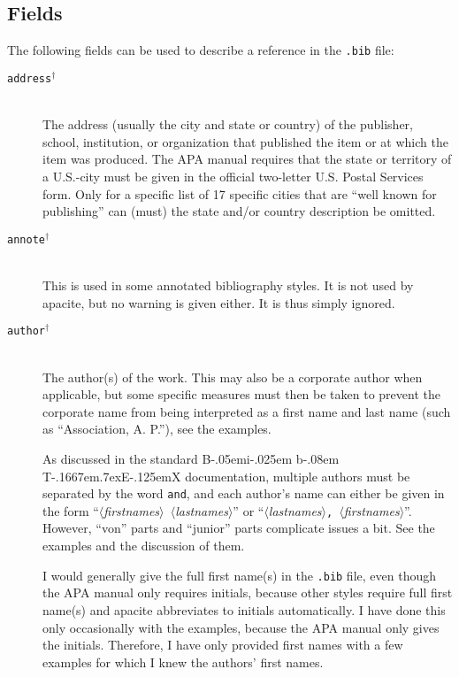 \documentclass{article}
\def\BibTeX{{\rm B\kern-.05em{\sc i\kern-.025em b}\kern-.08em
    T\kern-.1667em\lower.7ex\hbox{E}\kern-.125emX}}%
\newcommand{\LC}{\mbox{${}^{\dag}$}}%
\newcommand{\pkg}[1]{\textsf{#1}}%
\newcommand{\fname}[1]{\texttt{#1}}%
\newcommand{\fieldname}[1]{\texttt{#1}}%
\newcommand{\opt}[1]{$\langle${\itshape #1}$\rangle$}%
\begin{document}
\subsection{Fields}
\label{subsec:fields}
The following fields can be used to describe a reference in the
\fname{.bib} file:
\begin{description}

    \item[\fieldname{address}\LC] \mbox{}\\%
       The address (usually the city and state or country) of the
       publisher, school, institution, or organization that published
       the item or at which the item was produced. The APA manual
       requires that the state or territory of a U.S.-city must be given
       in the official two-letter U.S. Postal Services form. Only for
       a specific list of 17 specific cities that are ``well known
       for publishing'' can (must) the state and/or country
       description be omitted.

    \item[\fieldname{annote}\LC] \mbox{}\\
       This is used in some annotated bibliography
       styles. It is not used by \pkg{apacite}, but no warning
       is given either. It is thus simply ignored.

    \item[\fieldname{author}\LC] \mbox{}\\
       The author(s) of the work. This may also be a corporate
       author when applicable, but some specific measures must
       then be taken to prevent the corporate name from being
       interpreted as a first name and last name
       (such as ``Association, A. P.''), see the examples.

       As discussed in the standard \BibTeX{} documentation,
       multiple authors must be separated by the word \verb+and+,
       and each author's name can either be given in the form
       ``\opt{firstnames}\verb+ +\opt{lastnames}'' or
       ``\opt{lastnames}\verb+, +\opt{firstnames}''. However,
       ``von'' parts and ``junior'' parts complicate issues
       a bit. See the examples and the discussion of them.

       I would generally give the full first name(s) in the \fname{.bib}
       file, even though the APA manual only requires initials,
       because other styles require full first name(s) and
       \pkg{apacite} abbreviates to initials automatically.
       I have done this only occasionally with the examples,
       because the APA manual only gives the initials.
       Therefore, I have only provided first names with a few
       examples for which I knew the authors' first names.


\end{description}
\end{document}

